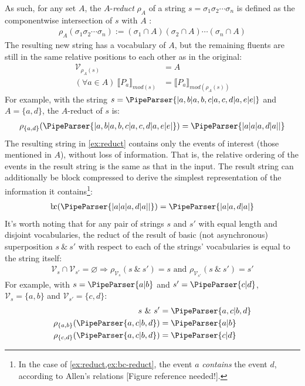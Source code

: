 \documentclass[a4paper,12pt,leqno]{article}
\newcommand{\bc}{{\rm b\!c}}
\newcommand{\vph}[1]{\vphantom{#1}}
\newcommand{\ebox}[1]{\fbox{$\vph{'(),}#1$}}
\renewcommand{\sp}{~\&~}
\newcommand{\V}{\mathcal{V}}
\renewcommand{\emptyset}{\varnothing}
\newcommand{\EventString}[1]{%
	\renewcommand*{\do}[1]{\ebox{##1}}%
	\PipeParser{#1}%
}
\newcommand{\refneeded}[1][]{{\color{red}[Figure reference needed!#1]}}
\begin{document}
As such, for any set $A$, the $A$-\textit{reduct} $\rho_A$ of a string $s=\sigma_1\sigma_2\cdots\sigma_n$ is defined as the componentwise intersection of $s$ with $A$ \citep{fernando2016regular,woods2018improving}:
\begin{align}
	\rho_A(\sigma_1\sigma_2\cdots\sigma_n) := (\sigma_1 \cap A)(\sigma_2 \cap A)\cdots(\sigma_n \cap A)
\end{align}
The resulting new string has a vocabulary of $A$, but the remaining fluents are still in the same relative positions to each other as in the original:
\begin{align}
	\V_{\rho_A(s)} &= A\\
	(\forall a \in A)~\llbracket P_a \rrbracket_{mod(s)} &= \llbracket P_a \rrbracket_{mod(\rho_A(s))}
\end{align}
For example, with the string $s = \EventString{{}|a,b|a,b,c|a,c,d|a,e|e|{}}$ and $A=\{a,d\}$, the $A$-reduct of $s$ is:
\begin{align}\label{ex:reduct}
	\rho_{\{a,d\}}(\EventString{{}|a,b|a,b,c|a,c,d|a,e|e|{}}) = \EventString{{}|a|a|a,d|a|{}|{}}
\end{align}
The resulting string in \cref{ex:reduct} contains only the events of interest (those mentioned in $A$), without loss of information. That is, the relative ordering of the events in the result string is the same as that in the input. The result string can additionally be block compressed to derive the simplest representation of the information it contains\footnote{In the case of \cref{ex:reduct,ex:bc-reduct}, the event $a$ \textit{contains} the event $d$, according to Allen's relations \citep{allen1983maintaining}\refneeded.}:
\begin{align}\label{ex:bc-reduct}
	\bc(\EventString{{}|a|a|a,d|a|{}|{}}) = \EventString{{}|a|a,d|a|{}}
\end{align}
It's worth noting that for any pair of strings $s$ and $s'$ with equal length and disjoint vocabularies, the reduct of the result of basic (not asynchronous) superposition $s \sp s'$ with respect to each of the strings' vocabularies is equal to the string itself:
\begin{align}\label{impl:disjoint-vocab-reduct}
	\V_{s} \cap \V_{s'} = \emptyset \Longrightarrow \rho_{\V_{s}}(s \sp s') = s \text{ and } \rho_{\V_{s'}}(s \sp s') = s'
\end{align}
For example, with $s = \EventString{a|b}$ and $s' = \EventString{c|d}$, $\V_s = \{a,b\}$ and $\V_{s'} = \{c,d\}$:
\begin{align}\label{ex:disjoint-vocab-reduct}
	s \sp s' &= \EventString{a,c|b,d}\\
	\rho_{\{a,b\}}(\EventString{a,c|b,d}) &= \EventString{a|b}\notag\\
	\rho_{\{c,d\}}(\EventString{a,c|b,d}) &= \EventString{c|d}\notag
\end{align}
\end{document}
